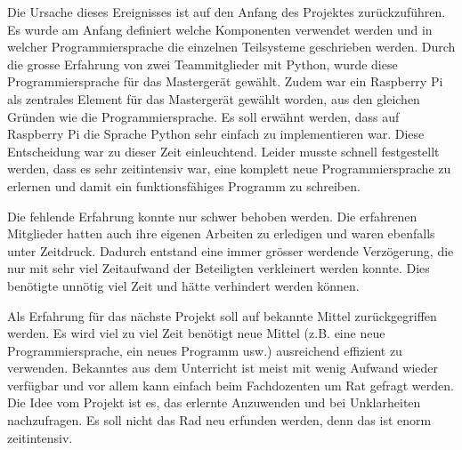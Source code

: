 Die   Ursache  dieses   Ereignisses   ist  auf   den   Anfang  des   Projektes
zur\"uckzuf\"uhren. Es wurde am Anfang  definiert welche Komponenten verwendet
werden und in welcher Programmiersprache die einzelnen Teilsysteme geschrieben
werden. Durch  die  grosse  Erfahrung  von  zwei  Teammitglieder  mit  Python,
wurde diese  Programmiersprache f\"ur  das Masterger\"at  gew\"ahlt. Zudem war
ein  Raspberry Pi  als  zentrales Element  f\"ur  das Masterger\"at  gew\"ahlt
worden,  aus  den  gleichen  Gr\"unden  wie  die  Programmiersprache. Es  soll
erw\"ahnt werden,  dass auf Raspberry  Pi die  Sprache Python sehr  einfach zu
implementieren war. Diese Entscheidung war zu dieser Zeit einleuchtend. Leider
musste  schnell  festgestellt werden,  dass  es  sehr zeitintensiv  war,  eine
komplett neue Programmiersprache zu  erlernen und damit ein funktionsf\"ahiges
Programm zu schreiben.

Die  fehlende  Erfahrung  konnte  nur schwer  behoben  werden. Die  erfahrenen
Mitglieder hatten auch ihre eigenen  Arbeiten zu erledigen und waren ebenfalls
unter Zeitdruck. Dadurch entstand eine immer gr\"osser werdende Verz\"ogerung,
die  nur  mit  sehr  viel   Zeitaufwand  der  Beteiligten  verkleinert  werden
konnte. Dies  ben\"otigte unn\"otig  viel Zeit  und h\"atte  verhindert werden
k\"onnen.

Als  Erfahrung   f\"ur  das  n\"achste   Projekt  soll  auf   bekannte  Mittel
zur\"uckgegriffen werden. Es  wird viel  zu viel  Zeit ben\"otigt  neue Mittel
(z.B.  eine  neue Programmiersprache,  ein  neues  Programm usw.)  ausreichend
effizient  zu verwenden. Bekanntes  aus  dem Unterricht  ist  meist mit  wenig
Aufwand wieder verf\"ugbar und vor allem kann einfach beim Fachdozenten um Rat
gefragt werden. Die Idee  vom Projekt ist es, das erlernte  Anzuwenden und bei
Unklarheiten nachzufragen. Es soll nicht das Rad neu erfunden werden, denn das
ist enorm zeitintensiv.
